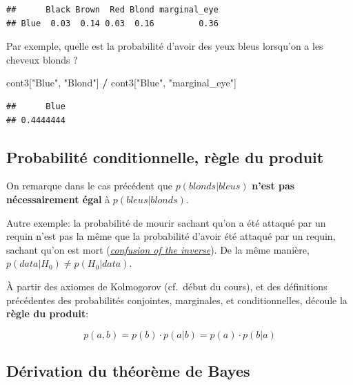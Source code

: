 \documentclass[
  a4paper,11pt,twoside,onecolumn,openright,final,oldfontcommands]{memoir}
\newenvironment{Shaded}{\begin{snugshade}}{\end{snugshade}}
\newcommand{\NormalTok}[1]{#1}
\newcommand{\OperatorTok}[1]{\textcolor[rgb]{0.81,0.36,0.00}{\textbf{#1}}}
\newcommand{\StringTok}[1]{\textcolor[rgb]{0.31,0.60,0.02}{#1}}
\theoremstyle{definition}
\theoremstyle{definition}
\theoremstyle{definition}
\theoremstyle{remark}
\begin{document}
\begin{verbatim}
##      Black Brown  Red Blond marginal_eye
## Blue  0.03  0.14 0.03  0.16         0.36
\end{verbatim}

Par exemple, quelle est la probabilité d'avoir des yeux bleus lorsqu'on a les cheveux blonds ?

\begin{Shaded}
\begin{Highlighting}[]
\NormalTok{cont3[}\StringTok{"Blue"}\NormalTok{, }\StringTok{"Blond"}\NormalTok{] }\OperatorTok{/}\StringTok{ }\NormalTok{cont3[}\StringTok{"Blue"}\NormalTok{, }\StringTok{"marginal\_eye"}\NormalTok{]  }
\end{Highlighting}
\end{Shaded}

\begin{verbatim}
##      Blue 
## 0.4444444
\end{verbatim}

\hypertarget{probabilituxe9-conditionnelle-ruxe8gle-du-produit}{%
\subsection{Probabilité conditionnelle, règle du produit}\label{probabilituxe9-conditionnelle-ruxe8gle-du-produit}}

On remarque dans le cas précédent que \(p(blonds|bleus)\) \textbf{n'est pas nécessairement égal} à \(p(bleus|blonds)\).

Autre exemple: la probabilité de mourir sachant qu'on a été attaqué par un requin n'est pas la même que la probabilité d'avoir été attaqué par un requin, sachant qu'on est mort (\href{https://en.wikipedia.org/wiki/Confusion_of_the_inverse}{\emph{confusion of the inverse}}). De la même manière, \(p(data|H_{0}) \neq p(H_{0}|data)\).

À partir des axiomes de Kolmogorov (cf.~début du cours), et des définitions précédentes des probabilités conjointes, marginales, et conditionnelles, découle la \textbf{règle du produit}:

\[p(a, b) = p(b) \cdot p(a|b) = p(a) \cdot p(b|a)\]

\hypertarget{duxe9rivation-du-thuxe9oruxe8me-de-bayes}{%
\subsection{Dérivation du théorème de Bayes}\label{duxe9rivation-du-thuxe9oruxe8me-de-bayes}}
\end{document}
